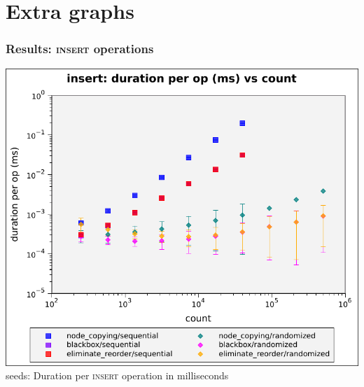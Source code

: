 \documentclass{beamer}
\begin{document}
\appendix
\section{Extra graphs}

\setlength{\columnseprule}{0.4pt}

\begin{frame}
\frametitle{Results: \textsc{insert} operations}
\begin{multicols}{2}

      \includegraphics[height=0.55\textheight]{figures/graphs/100-seeds/insert-duration-per-op-vs-count.pdf}
       seeds: Duration per \textsc{insert} operation in milliseconds\vphantom{ --- only head node}
      \newline \phantom{ --- only head node}



\end{multicols}
\end{frame}
\end{document}
